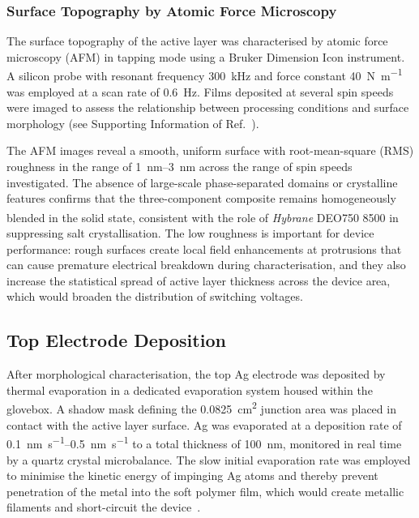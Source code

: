 \documentclass[12pt, a4paper, twoside]{report}
\newcommand{\Hybrane}{\textit{Hybrane}\textsuperscript{\textregistered} DEO750 8500}
\begin{document}
\subsubsection{Surface Topography by Atomic Force Microscopy}

The surface topography of the active layer was characterised by atomic force microscopy (AFM) in tapping mode using a Bruker Dimension Icon instrument. A silicon probe with resonant frequency \SI{300}{\kilo\hertz} and force constant \SI{40}{\newton\per\metre} was employed at a scan rate of \SI{0.6}{\hertz}. Films deposited at several spin speeds were imaged to assess the relationship between processing conditions and surface morphology (see Supporting Information of Ref.~\cite{PradoSocorro2022}).

The AFM images reveal a smooth, uniform surface with root-mean-square (RMS) roughness in the range of \SIrange{1}{3}{\nano\metre} across the range of spin speeds investigated. The absence of large-scale phase-separated domains or crystalline features confirms that the three-component composite remains homogeneously blended in the solid state, consistent with the role of \Hybrane{} in suppressing salt crystallisation. The low roughness is important for device performance: rough surfaces create local field enhancements at protrusions that can cause premature electrical breakdown during characterisation, and they also increase the statistical spread of active layer thickness across the device area, which would broaden the distribution of switching voltages.

\subsection{Top Electrode Deposition}\label{subsec:electrode}

After morphological characterisation, the top Ag electrode was deposited by thermal evaporation in a dedicated evaporation system housed within the glovebox. A shadow mask defining the \SI{0.0825}{\square\centi\metre} junction area was placed in contact with the active layer surface. Ag was evaporated at a deposition rate of \SIrange{0.1}{0.5}{\nano\metre\per\second} to a total thickness of \SI{100}{\nano\metre}, monitored in real time by a quartz crystal microbalance. The slow initial evaporation rate was employed to minimise the kinetic energy of impinging Ag atoms and thereby prevent penetration of the metal into the soft polymer film, which would create metallic filaments and short-circuit the device~\cite{Hung1997}.
\end{document}
